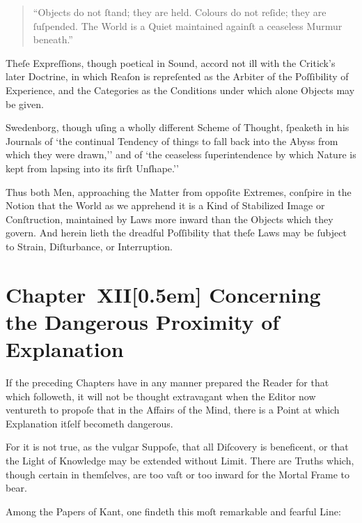 \documentclass[12pt]{book}
\begin{document}
\begin{quote}
``Objects do not ſtand; they are held. Colours do not reſide; they are ſuſpended. The World is a Quiet maintained againſt a ceaseless Murmur beneath.''
\end{quote}

Theſe Expreſſions, though poetical in Sound, accord not ill with the Critick’s later Doctrine, in which Reaſon is repreſented as the Arbiter of the Poſſibility of Experience, and the Categories as the Conditions under which alone Objects may be given.

Swedenborg, though uſing a wholly different Scheme of Thought, ſpeaketh in his Journals of `the continual Tendency of things to fall back into the Abyss from which they were drawn,'' and of `the ceaseless ſuperintendence by which Nature is kept from lapsing into its firſt Unſhape.''

Thus both Men, approaching the Matter from oppoſite Extremes, conſpire in the Notion that the World as we apprehend it is a Kind of Stabilized Image or Conſtruction, maintained by Laws more inward than the Objects which they govern. And herein lieth the dreadful Poſſibility that theſe Laws may be ſubject to Strain, Diſturbance, or Interruption.


\chapter*{Chapter~XII[0.5em]
Concerning the Dangerous Proximity of Explanation}


If the preceding Chapters have in any manner prepared the Reader for that which followeth, it will not be thought extravagant when the Editor now ventureth to propoſe that in the Affairs of the Mind, there is a Point at which Explanation itſelf becometh dangerous.

For it is not true, as the vulgar Suppoſe, that all Diſcovery is beneficent, or that the Light of Knowledge may be extended without Limit. There are Truths which, though certain in themſelves, are too vaſt or too inward for the Mortal Frame to bear.

Among the Papers of Kant, one findeth this moſt remarkable and fearful Line:
\end{document}
